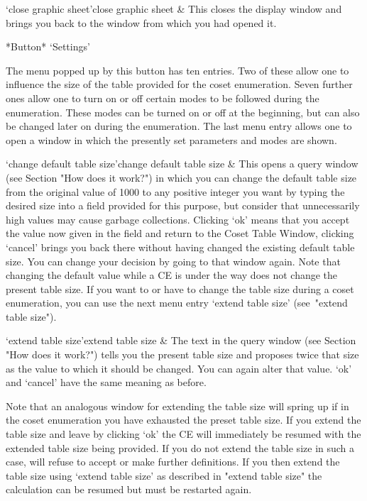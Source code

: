 \>`close graphic sheet'{close graphic sheet} &
  This closes the display window and brings you back to the window from
  which you had opened it.

\enditems

*Button* `Settings'

The menu popped up by this button has ten entries. Two of these allow
one to influence the size of the table provided for the coset
enumeration. Seven further ones allow one to turn on or off certain
modes to be followed during the enumeration. These modes can be
turned on or off at the beginning, but can also be changed later on
during the enumeration. The last menu entry allows one to open a window
in which the presently set parameters and modes are shown.

\beginitems

\>`change default table size'{change default table size} &
  This opens a query window (see Section "How does it work?") in which
  you can change the default table size from the original value of
  1000 to any positive integer you want by typing the desired size
  into a field provided for this purpose, but consider that
  unnecessarily high values may cause garbage collections. Clicking
  `ok' means that you accept the value now given in the field and return
  to the Coset Table Window, clicking `cancel' brings you back there
  without having changed the existing default table size. You can
  change your decision by going to that window again. Note that
  changing the default value while a CE is under the way does not change
  the present table size. If you want to or have to change the table
  size during a coset enumeration, you can use the next menu entry
  `extend table size' (see~"extend table size").

\>`extend table size'{extend table size} &
  The text in the query window (see Section "How does it work?") tells
  you the present table size and proposes twice that size as the value
  to which it should be changed. You can again alter that value. `ok'
  and `cancel' have the same meaning as before.

\enditems

Note that an analogous window for extending the table size will spring
up if in the coset enumeration you have exhausted the preset table
size. If you extend the table size and leave by clicking `ok' the CE
will immediately be resumed with the extended table size being
provided. If you do not extend the table size in such a case, {\ITC}
will refuse to accept or make further definitions. If you then extend
the table size using `extend table size' as described in "extend table
size" the calculation can be resumed but must be restarted again.

